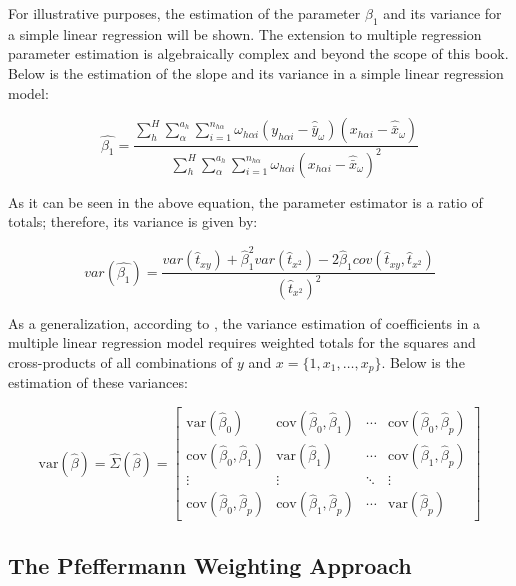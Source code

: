 \documentclass[
  12pt,
]{book}
\begin{document}
For illustrative purposes, the estimation of the parameter \(\beta_{1}\) and its variance for a simple linear regression will be shown. The extension to multiple regression parameter estimation is algebraically complex and beyond the scope of this book. Below is the estimation of the slope and its variance in a simple linear regression model:

\[
\hat{\beta_{1}} = \frac{\sum_{h}^{H}\sum_{\alpha}^{a_{h}}\sum_{i=1}^{n_{h\alpha}}\omega_{h\alpha i}\left(y_{h\alpha i}-\hat{\bar{y}}_{\omega}\right)\left(x_{h\alpha i}-\hat{\bar{x}}_{\omega}\right)}{\sum_{h}^{H}\sum_{\alpha}^{a_{h}}\sum_{i=1}^{n_{h\alpha}}\omega_{h\alpha i}\left(x_{h\alpha i}-\hat{\bar{x}}_{\omega}\right)^{2}}
\]

As it can be seen in the above equation, the parameter estimator is a ratio of totals; therefore, its variance is given by:

\[
var\left(\hat{\beta_{1}}\right)  =  \frac{var\left(\hat{t}_{xy}\right)+\hat{\beta}_{1}^{2}var\left(\hat{t}_{x^{2}}\right)-2\hat{\beta}_{1}cov\left(\hat{t}_{xy},\hat{t}_{x^{2}}\right)}{\left(\hat{t}_{x^{2}}\right)^{2}}
\]

As a generalization, according to \citet{kish1974inference}, the variance estimation of coefficients in a multiple linear regression model requires weighted totals for the squares and cross-products of all combinations of \(y\) and \(x = \{1, x_{1}, \ldots, x_{p}\}\). Below is the estimation of these variances:

\[
\text{var}\left(\hat{\beta}\right) = \hat{\Sigma}\left(\hat{\beta}\right) = 
\begin{bmatrix}
\text{var}\left(\hat{\beta}_{0}\right) & \text{cov}\left(\hat{\beta}_{0},\hat{\beta}_{1}\right) & \cdots & \text{cov}\left(\hat{\beta}_{0},\hat{\beta}_{p}\right) \\
\text{cov}\left(\hat{\beta}_{0},\hat{\beta}_{1}\right) & \text{var}\left(\hat{\beta}_{1}\right) & \cdots & \text{cov}\left(\hat{\beta}_{1},\hat{\beta}_{p}\right) \\
\vdots & \vdots & \ddots & \vdots \\
\text{cov}\left(\hat{\beta}_{0},\hat{\beta}_{p}\right) & \text{cov}\left(\hat{\beta}_{1},\hat{\beta}_{p}\right) & \cdots & \text{var}\left(\hat{\beta}_{p}\right)
\end{bmatrix}
\]

\hypertarget{the-pfeffermann-weighting-approach}{%
\subsection{The Pfeffermann Weighting Approach}\label{the-pfeffermann-weighting-approach}}
\end{document}
